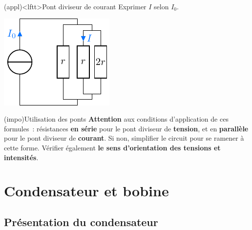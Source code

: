 \documentclass[../../main/main.tex]{subfiles}
\begin{document}
\begin{tcb}[breakable, sidebyside, lefthand ratio=.3](appl)<lftt>{Pont diviseur de courant}
	Exprimer $I$ selon $I_0$.
	\begin{center}
		\includegraphics[scale=1]{divcour_last-plain}
	\end{center}
	\tcblower
	\begin{isd}
		\tcblower
	\end{isd}
\end{tcb}

\begin{tcb*}[label=impo:ponts](impo){Utilisation des ponts}
	\textbf{Attention} aux conditions d'application de ces formules~: résistances
	\textbf{en série} pour le pont diviseur de \textbf{tension}, et en
	\textbf{parallèle} pour le pont diviseur de \textbf{courant}.
	\smallbreak
	Si non, simplifier le circuit pour se ramener à cette forme. Vérifier
	également \textbf{le sens d'orientation des tensions et intensités}.
\end{tcb*}

\section{Condensateur et bobine}
\subsection{Présentation du condensateur}
\end{document}
